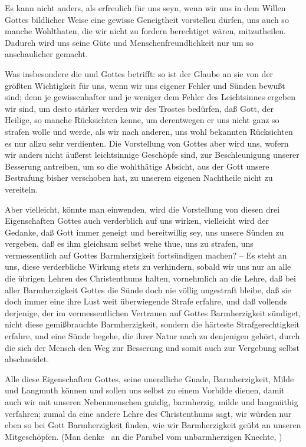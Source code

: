 \begin{aufza}
\item Es kann nicht anders, als erfreulich für uns seyn, wenn wir uns in dem Willen Gottes bildlicher Weise eine gewisse Geneigtheit vorstellen dürfen, uns auch so manche Wohlthaten, die wir nicht zu fordern berechtiget wären, mitzutheilen. Dadurch wird uns seine Güte und Menschenfreundlichkeit nur um so anschaulicher gemacht.~
\item Was insbesondere die  und  Gottes betrifft: so ist der Glaube an sie von der größten Wichtigkeit für uns, wenn wir uns eigener Fehler und Sünden bewußt sind; denn je gewissenhafter und je weniger dem Fehler des Leichtsinnes ergeben wir sind, um desto stärker werden wir des Trostes bedürfen, daß Gott, der Heilige, so manche Rücksichten kenne, um derentwegen er uns nicht ganz so strafen wolle und werde, als wir nach anderen, uns wohl bekannten Rücksichten es nur allzu sehr verdienten. Die Vorstellung von Gottes  aber wird uns, wofern wir anders nicht äußerst leichtsinnige Geschöpfe sind, zur Beschleunigung unserer Besserung antreiben, um so die wohlthätige Absicht, aus der Gott unsere Bestrafung bisher verschoben hat, zu unserem eigenen Nachtheile nicht zu vereiteln.

\begin{RWanm}
Aber vielleicht, könnte man einwenden, wird die Vorstellung von diesen drei Eigenschaften Gottes auch verderblich auf uns wirken, vielleicht wird der Gedanke, daß Gott immer geneigt und bereitwillig sey, uns unsere Sünden zu vergeben, daß es ihm gleichsam selbst wehe thue, uns zu strafen, uns vermessentlich auf Gottes Barmherzigkeit fortsündigen machen? -- Es steht an uns, diese verderbliche Wirkung stets zu verhindern, sobald wir uns nur an alle die übrigen Lehren des Christenthums halten, vornehmlich an die Lehre, daß bei aller Barmherzigkeit Gottes die Sünde doch nie völlig ungestraft bleibe, daß sie doch immer eine ihre Lust weit überwiegende Strafe erfahre, und daß vollends derjenige, der im vermessentlichen Vertrauen auf Gottes Barmherzigkeit sündiget, nicht diese gemißbrauchte Barmherzigkeit, sondern die härteste Strafgerechtigkeit erfahre, und eine Sünde begehe, die ihrer Natur nach zu denjenigen gehört, durch die sich der Mensch den Weg zur Besserung und somit auch zur Vergebung selbst abschneidet.\end{RWanm}
\item Alle diese Eigenschaften Gottes, seine unendliche Gnade, Barmherzigkeit, Milde und Langmuth können und sollen uns selbst zu einem Vorbilde dienen, damit auch wir mit unseren Nebenmenschen gnädig, barmherzig, milde und langmüthig verfahren; zumal da eine andere Lehre des Christenthums sagt, wir würden nur eben so bei Gott Barmherzigkeit finden, wie wir Barmherzigkeit geübt an unseren Mitgeschöpfen. (Man denke \zB\ an die Parabel vom unbarmherzigen Knechte, \ua )~
\end{aufza}

